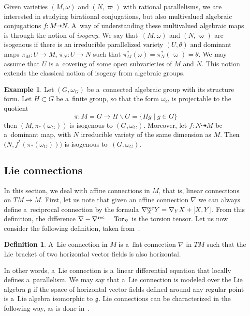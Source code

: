 \documentclass[10pt,a4paper]{amsart}
\numberwithin{equation}{section}
\theoremstyle{definition}
\newtheorem{Definition}[Theorem]{Definition}
\newtheorem{Example}[Theorem]{Example}
\begin{document}
Given varieties $(M,\omega)$ and $(N,\varpi)$ with rational parallelisms, we are interested in studying birational conjugations, but also multivalued algebraic conjugations $f\colon M\dasharrow N$. A~way of understanding these multivalued algebraic maps is through the notion of \emph{isogeny}. We say that~$(M,\omega)$ and $(N,\varpi)$ are isogenous if there is an irreducible parallelized variety $(U,\theta)$ and dominant maps $\pi_M \colon U\to M$, $\pi_N\colon U \to N$ such that $\pi_M^*(\omega) = \pi_N^*(\varpi) = \theta$. We may assume that $U$ is a~covering of some open subvarieties of $M$ and $N$. This notion extends the classical notion of isogeny from algebraic groups.

\begin{Example}
 Let $(G,\omega_G)$ be a~connected algebraic group with its structure form. Let $H\subset G$ be a~finite group, so that the form $\omega_G$ is projectable to the quotient
 \[\pi\colon M = G\to H\backslash G = \{Hg \mid g\in G\}\]
 then $(M, \pi_*(\omega_G))$ is isogenous to $(G,\omega_G)$. Moreover, let $f\colon N\dasharrow M$ be a~dominant map, with $N$ irreducible variety of the same dimension as $M$. Then $\bigl(N,f^*(\pi_*(\omega_G))\bigr)$
 is isogenous to~$(G,\omega_G)$.
\end{Example}

\subsection{Lie connections}

In this section, we deal with affine connections in $M$, that is, linear connections on $TM\to M$. First, let us note that given an affine connection $\nabla$ we can always define a~reciprocal connection by the formula
$\nabla^{\rm rec}_X Y = \nabla_Y X + [X,Y]$.
From this definition, the difference $\nabla - \nabla^{\rm rec}= {\rm Tor}_\nabla$ is the torsion tensor. Let us now consider the following definition, taken from~\cite{bc2017}.

\begin{Definition} A~Lie connection in $M$ is a~flat connection $\nabla$ in $TM$ such that the Lie bracket of two horizontal vector fields is also horizontal.
\end{Definition}

In other words, a~Lie connection is a~linear differential equation that locally defines a~parallelism. We may say that a~Lie connection is modeled over the Lie algebra $\mathfrak g$ if the space of horizontal vector fields defined around any regular point is a~Lie algebra isomorphic to $\mathfrak g$. Lie connections can be characterized in the following way, as is done in~\cite[Proposition 3.10]{bc2017}.
\end{document}
